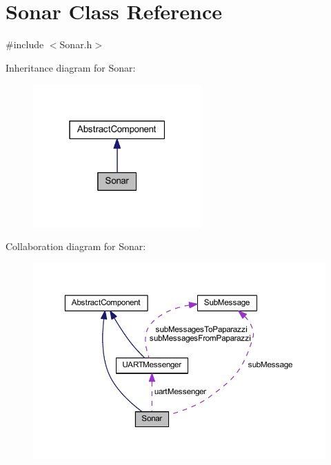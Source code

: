 \hypertarget{class_sonar}{}\section{Sonar Class Reference}
\label{class_sonar}


{\ttfamily \#include $<$Sonar.\+h$>$}



Inheritance diagram for Sonar\+:\nopagebreak
\begin{figure}[H]
\begin{center}
\leavevmode
\includegraphics[width=183pt]{class_sonar__inherit__graph}
\end{center}
\end{figure}


Collaboration diagram for Sonar\+:\nopagebreak
\begin{figure}[H]
\begin{center}
\leavevmode
\includegraphics[width=350pt]{class_sonar__coll__graph}
\end{center}
\end{figure}

